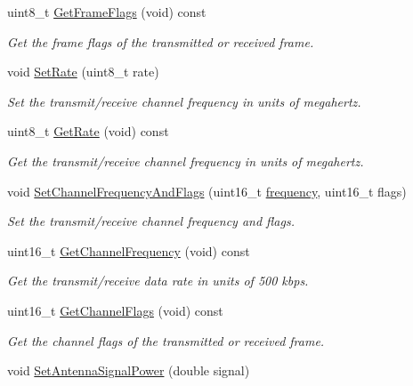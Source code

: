 \begin{DoxyCompactItemize}
uint8\+\_\+t \hyperlink{classns3_1_1RadiotapHeader_ab885ce23d57463a72e727afcc419e2a1}{Get\+Frame\+Flags} (void) const 
\begin{DoxyCompactList}\small\item\em Get the frame flags of the transmitted or received frame. \end{DoxyCompactList}\item 
void \hyperlink{classns3_1_1RadiotapHeader_a51ebd0157939e926630a940dcc4431aa}{Set\+Rate} (uint8\+\_\+t rate)
\begin{DoxyCompactList}\small\item\em Set the transmit/receive channel frequency in units of megahertz. \end{DoxyCompactList}\item 
uint8\+\_\+t \hyperlink{classns3_1_1RadiotapHeader_a82e262ec707cda3525b4e4672b31068c}{Get\+Rate} (void) const 
\begin{DoxyCompactList}\small\item\em Get the transmit/receive channel frequency in units of megahertz. \end{DoxyCompactList}\item 
void \hyperlink{classns3_1_1RadiotapHeader_a429f94fc9a90307134b62cd1d6ed58b9}{Set\+Channel\+Frequency\+And\+Flags} (uint16\+\_\+t \hyperlink{mmwave_2model_2fading-traces_2fading__trace__generator_8m_a09045328d6d7e16aa4013f526cc6993d}{frequency}, uint16\+\_\+t flags)
\begin{DoxyCompactList}\small\item\em Set the transmit/receive channel frequency and flags. \end{DoxyCompactList}\item 
uint16\+\_\+t \hyperlink{classns3_1_1RadiotapHeader_af00f8093e8a1d00c482b98bf18d8c0ee}{Get\+Channel\+Frequency} (void) const 
\begin{DoxyCompactList}\small\item\em Get the transmit/receive data rate in units of 500 kbps. \end{DoxyCompactList}\item 
uint16\+\_\+t \hyperlink{classns3_1_1RadiotapHeader_a4827a794162f500c06e67e16b0158d84}{Get\+Channel\+Flags} (void) const 
\begin{DoxyCompactList}\small\item\em Get the channel flags of the transmitted or received frame. \end{DoxyCompactList}\item 
void \hyperlink{classns3_1_1RadiotapHeader_a57c25791d9c71357a48ed130dce24066}{Set\+Antenna\+Signal\+Power} (double signal)

\end{DoxyCompactItemize}
